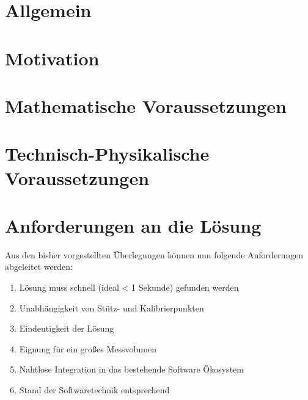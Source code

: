 %
\section[Allgemein]{Allgemein}

%
\section[Motivation]{Motivation}

%
%
\section[Mathematische Voraussetzungen]{Mathematische Voraussetzungen}

%
%
\section[Technische Voraussetzungen]{Technisch-Physikalische Voraussetzungen}

%
\section[Anforderungen]{Anforderungen an die Lösung}
%
Aus den bisher vorgestellten Überlegungen können nun folgende Anforderungen abgeleitet werden:
%
\begin{enumerate}
	\item Lösung muss schnell (ideal < 1 Sekunde) gefunden werden
	\item Unabhängigkeit von Stütz- und Kalibrierpunkten
	\item Eindeutigkeit der Lösung
	\item Eignung für ein großes Messvolumen
	\item Nahtlose Integration in das bestehende Software Ökosystem
	\item Stand der Softwaretechnik entsprechend
%
\end{enumerate}
%
